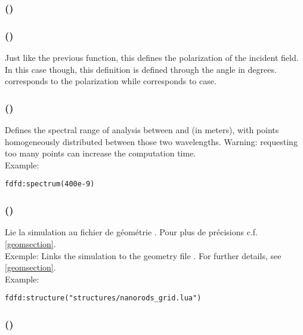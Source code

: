 \langswitch
{
	\subsubsection[polarization (variante à angle)]{()}
}{
	\subsubsection[polarization (angle variant)]{()}
}

\langswitch
{
	\fwarn
}{
	Just like the previous function, this defines the polarization of the incident field. In this case though, this definition is defined through the angle  in degrees.  corresponds to the  polarization while  corresponds to  case.
}

\subsubsection[spectrum]{()}

\langswitch
{
	\fwarn
}{
	Defines the spectral range of analysis between  and  (in meters), with  points homogeneously distributed between those two wavelengths. Warning: requesting too many points can increase the computation time.\\ Example:
}
\begin{lstlisting}
fdfd:spectrum(400e-9)
\end{lstlisting}

\subsubsection[structure]{()}

\langswitch
{
	Lie la simulation au fichier de géométrie . Pour plus de précisions c.f. \ref{geomsection}.\\ Exemple:
}
{
	Links the simulation to the geometry file . For further details, see \ref{geomsection}.\\ Example:
}
\begin{lstlisting}
fdfd:structure("structures/nanorods_grid.lua")
\end{lstlisting}

\subsubsection[struct\_append]{()}

